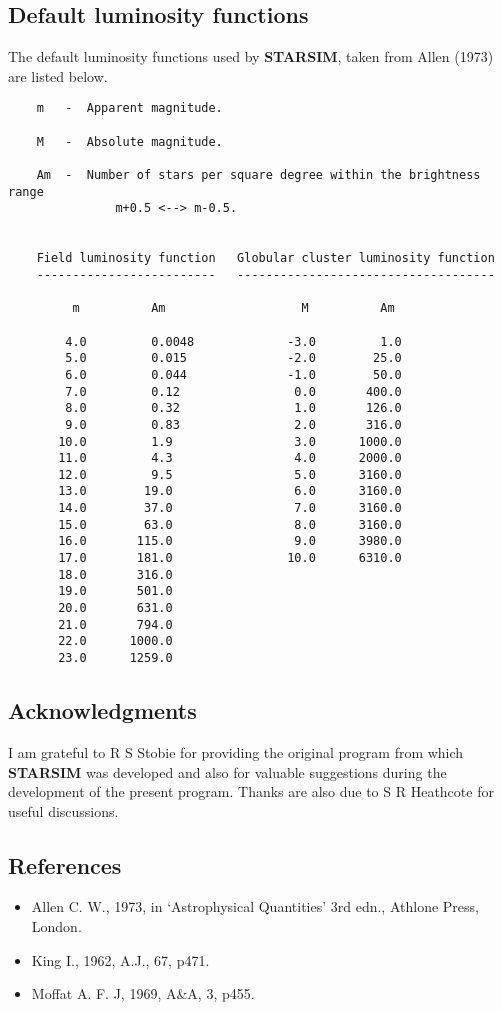 \subsection {Default luminosity functions}
The default luminosity functions used by {\bf STARSIM}, taken from Allen (1973)
are listed below.
\begin{verbatim}
    m   -  Apparent magnitude.

    M   -  Absolute magnitude.

    Am  -  Number of stars per square degree within the brightness range
               m+0.5 <--> m-0.5.


    Field luminosity function   Globular cluster luminosity function
    -------------------------   ------------------------------------

         m          Am                   M          Am

        4.0         0.0048             -3.0         1.0
        5.0         0.015              -2.0        25.0
        6.0         0.044              -1.0        50.0
        7.0         0.12                0.0       400.0
        8.0         0.32                1.0       126.0
        9.0         0.83                2.0       316.0
       10.0         1.9                 3.0      1000.0
       11.0         4.3                 4.0      2000.0
       12.0         9.5                 5.0      3160.0
       13.0        19.0                 6.0      3160.0
       14.0        37.0                 7.0      3160.0
       15.0        63.0                 8.0      3160.0
       16.0       115.0                 9.0      3980.0
       17.0       181.0                10.0      6310.0
       18.0       316.0
       19.0       501.0
       20.0       631.0
       21.0       794.0
       22.0      1000.0
       23.0      1259.0
\end{verbatim}
\subsection {Acknowledgments}
I am grateful to R S Stobie for providing the original program from which
{\bf STARSIM} was developed and also for valuable suggestions during the
development of the present program.
Thanks are also due to  S R Heathcote for useful discussions.
\subsection {References}
\begin{itemize}
\item Allen C. W., 1973, in `Astrophysical Quantities' 3rd edn., Athlone Press,
London.
\item King I., 1962, A.J., 67, p471.
\item Moffat A. F. J, 1969, A\&A, 3, p455.
\end{itemize}

